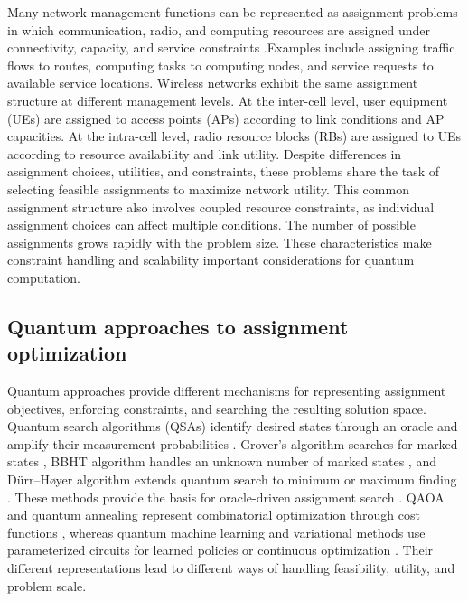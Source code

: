 \documentclass[journal]{IEEEtran}
\begin{document}
{{Many network management functions can be represented as assignment problems in which communication, radio, and computing resources are assigned under connectivity, capacity, and service constraints \cite{yi2025towards,chowdhary2022intent}.Examples include assigning traffic flows to routes, computing tasks to computing nodes, and service requests to available service locations. Wireless networks exhibit the same assignment structure at different management levels. At the inter-cell level, user equipment (UEs) are assigned to access points (APs) according to link conditions and AP capacities. At the intra-cell level, radio resource blocks (RBs) are assigned to UEs according to resource availability and link utility. Despite differences in assignment choices, utilities, and constraints, these problems share the task of selecting feasible assignments to maximize network utility.
This common assignment structure also involves coupled resource constraints, as individual assignment choices can affect multiple conditions. The number of possible assignments grows rapidly with the problem size. These characteristics make constraint handling and scalability important considerations for quantum computation.

\vspace{-3mm}
\subsection{Quantum approaches to assignment optimization}
\label{sec:bg-quantum}

Quantum approaches provide different mechanisms for representing assignment objectives, enforcing constraints, and searching the resulting solution space. Quantum search algorithms (QSAs) identify desired states through an oracle and amplify their measurement probabilities \cite{nielsen2011}. Grover's algorithm searches for marked states \cite{grover1996}, BBHT algorithm handles an unknown number of marked states \cite{boyer1998}, and D\"urr--H\o yer algorithm extends quantum search to minimum or maximum finding \cite{durr1996}. These methods provide the basis for oracle-driven assignment search \cite{botsinis2019}. QAOA and quantum annealing represent combinatorial optimization through cost functions \cite{kadowaki1998,farhi2014,lucas2014}, whereas quantum machine learning and variational methods use parameterized circuits for learned policies or continuous optimization \cite{narottama2022qnn,ansere2024qdrl,zhang2024beamforming,
sharma2026tnse}. Their different representations lead to different ways of handling feasibility, utility, and problem scale.

}}
\end{document}
